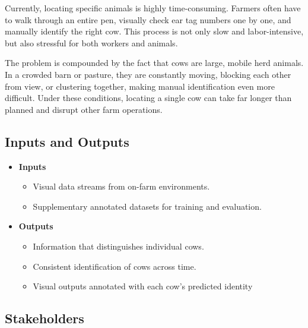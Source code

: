 \documentclass{article}
\begin{document}
    Currently, locating specific animals is highly time-consuming. Farmers often 
    have to walk through an entire pen, visually check ear tag numbers one by one, 
    and manually identify the right cow. This process is not only slow and 
    labor-intensive, but also stressful for both workers and animals.

    \setlength{\parskip}{0.6em} 

    The problem is compounded by the fact that cows are large, mobile herd animals. 
    In a crowded barn or pasture, they are constantly moving, blocking each other 
    from view, or clustering together, making manual identification even more 
    difficult. Under these conditions, locating a single cow can take far longer 
    than planned and disrupt other farm operations. 


\subsection{Inputs and Outputs}


\begin{itemize}
    \item \textbf{Inputs}
          \begin{itemize}
                \item Visual data streams from on-farm environments.
                \item Supplementary annotated datasets for training and evaluation.
          \end{itemize}

    \item \textbf{Outputs}
          \begin{itemize}
              \item Information that distinguishes individual cows.
              \item Consistent identification of cows across time.
              \item Visual outputs annotated with each cow's predicted identity
          \end{itemize}
\end{itemize}




\subsection{Stakeholders}
\end{document}
